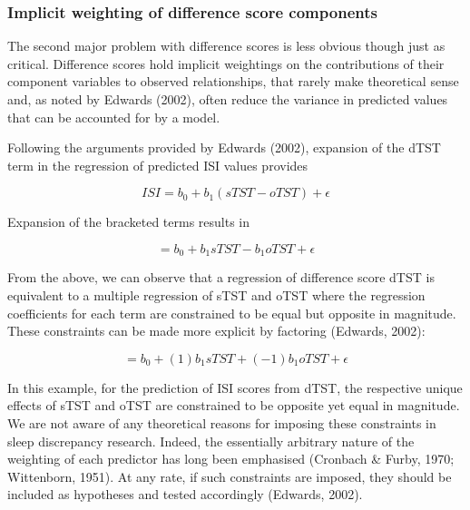 \documentclass[
]{article}
\begin{document}
\subsubsection{Implicit weighting of difference score components}\label{implicit-weighting-of-difference-score-components}

The second major problem with difference scores is less obvious though just as critical. Difference scores hold implicit weightings on the contributions of their component variables to observed relationships, that rarely make theoretical sense and, as noted by Edwards (2002), often reduce the variance in predicted values that can be accounted for by a model.

Following the arguments provided by Edwards (2002), expansion of the dTST term in the regression of predicted ISI values provides

\begin{equation}
ISI = b_{0}+b_{1}({sTST-oTST}) + \epsilon
\label{eq:lmdiff2}
\end{equation}

Expansion of the bracketed terms results in

\begin{equation}
= b_{0} + b_{1} sTST - b_{1}oTST + \epsilon
\label{eq:lmdiff3}
\end{equation}

From the above, we can observe that a regression of difference score dTST is equivalent to a multiple regression of sTST and oTST where the regression coefficients for each term are constrained to be equal but opposite in magnitude. These constraints can be made more explicit by factoring (Edwards, 2002):

\begin{equation}
= b_{0} + (1)b_{1}sTST + (-1)b_{1}oTST + \epsilon
\label{eq:lmdiff4}
\end{equation}

In this example, for the prediction of ISI scores from dTST, the respective unique effects of sTST and oTST are constrained to be opposite yet equal in magnitude. We are not aware of any theoretical reasons for imposing these constraints in sleep discrepancy research. Indeed, the essentially arbitrary nature of the weighting of each predictor has long been emphasised (Cronbach \& Furby, 1970; Wittenborn, 1951). At any rate, if such constraints are imposed, they should be included as hypotheses and tested accordingly (Edwards, 2002).
\end{document}
